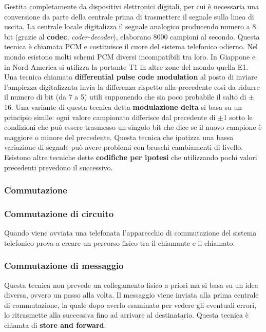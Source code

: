 Gestita completamente da dispositivi elettronici digitali, per cui è necessaria una conversione da parte della centrale prima di trasmettere il segnale sulla linea di uscita. La centrale locale digitalizza il segnale analogico producendo numero a 8 bit (grazie al \textbf{codec}, \textit{coder-decoder}), elaborano  8000 campioni al secondo. Questa tecnica è chiamata PCM e costituisce il cuore del sistema telefonico odierno. Nel mondo esistono molti schemi PCM diversi incompatibili tra loro. In Giappone e in Nord America si utilizza la portante T1 in altre zone del mondo quella E1. Una tecnica chiamata \textbf{differential pulse code modulation} al posto di inviare l'ampiezza digitalizzata invia la differenza rispetto alla precedente così da ridurre il numero di bit (da 7 a 5) utili supponendo che sia poco probabile il salto di \(\pm\)16. Una variante di questa tecnica detta \textbf{modulazione delta} si basa su un principio simile: ogni valore campionato differisce dal precedente di \(\pm\)1 sotto le condizioni che può essere trasmesso un singolo bit che dice se il nuovo campione è maggiore o minore del precedente. Questa tecnica che ipotizza una bassa variazione di segnale può avere problemi con bruschi cambiamenti di livello. Esistono altre tecniche dette \textbf{codifiche per ipotesi} che utilizzando pochi valori precedenti prevedono il successivo.

\subsubsection{Commutazione}

\subsubsection*{Commutazione di circuito}

Quando viene avviata una telefonata l'apparecchio di commutazione del sistema telefonico prova a creare un percorso fisico tra il chiamante e il chiamato. 

\subsubsection*{Commutazione di messaggio}

Questa tecnica non prevede un collegamento fisico a priori ma si basa su un idea diversa, ovvero un passo alla volta. Il messaggio viene inviata alla prima centrale di commutazione, la quale dopo averlo esaminato per vedere gli eventuali errori, lo ritrasmette alla successiva fino ad arrivare al destinatario. Questa tecnica è chiamta di \textbf{store and forward}.

